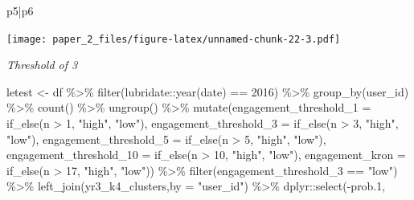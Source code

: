 \documentclass[
]{article}
\newenvironment{Shaded}{\begin{snugshade}}{\end{snugshade}}
\newcommand{\AttributeTok}[1]{\textcolor[rgb]{0.77,0.63,0.00}{#1}}
\newcommand{\DecValTok}[1]{\textcolor[rgb]{0.00,0.00,0.81}{#1}}
\newcommand{\FloatTok}[1]{\textcolor[rgb]{0.00,0.00,0.81}{#1}}
\newcommand{\FunctionTok}[1]{\textcolor[rgb]{0.00,0.00,0.00}{#1}}
\newcommand{\NormalTok}[1]{#1}
\newcommand{\OtherTok}[1]{\textcolor[rgb]{0.56,0.35,0.01}{#1}}
\newcommand{\SpecialCharTok}[1]{\textcolor[rgb]{0.00,0.00,0.00}{#1}}
\newcommand{\StringTok}[1]{\textcolor[rgb]{0.31,0.60,0.02}{#1}}
\begin{document}
\begin{Shaded}
\begin{Highlighting}[]
\NormalTok{p5}\SpecialCharTok{|}\NormalTok{p6}
\end{Highlighting}
\end{Shaded}

\texttt{[image: paper\_2\_files/figure-latex/unnamed-chunk-22-3.pdf]}

\emph{Threshold of 3}

\begin{Shaded}
\begin{Highlighting}[]
\NormalTok{letest }\OtherTok{\textless{}{-}}\NormalTok{  df }\SpecialCharTok{\%\textgreater{}\%}
  \FunctionTok{filter}\NormalTok{(lubridate}\SpecialCharTok{::}\FunctionTok{year}\NormalTok{(date) }\SpecialCharTok{==} \DecValTok{2016}\NormalTok{) }\SpecialCharTok{\%\textgreater{}\%}
  \FunctionTok{group\_by}\NormalTok{(user\_id) }\SpecialCharTok{\%\textgreater{}\%}
  \FunctionTok{count}\NormalTok{() }\SpecialCharTok{\%\textgreater{}\%}
  \FunctionTok{ungroup}\NormalTok{() }\SpecialCharTok{\%\textgreater{}\%} 
  \FunctionTok{mutate}\NormalTok{(}\AttributeTok{engagement\_threshold\_1 =} \FunctionTok{if\_else}\NormalTok{(n }\SpecialCharTok{\textgreater{}} \DecValTok{1}\NormalTok{, }\StringTok{"high"}\NormalTok{, }\StringTok{"low"}\NormalTok{),}
         \AttributeTok{engagement\_threshold\_3 =} \FunctionTok{if\_else}\NormalTok{(n }\SpecialCharTok{\textgreater{}} \DecValTok{3}\NormalTok{, }\StringTok{"high"}\NormalTok{, }\StringTok{"low"}\NormalTok{),}
         \AttributeTok{engagement\_threshold\_5 =} \FunctionTok{if\_else}\NormalTok{(n }\SpecialCharTok{\textgreater{}} \DecValTok{5}\NormalTok{, }\StringTok{"high"}\NormalTok{, }\StringTok{"low"}\NormalTok{),}
         \AttributeTok{engagement\_threshold\_10 =} \FunctionTok{if\_else}\NormalTok{(n }\SpecialCharTok{\textgreater{}} \DecValTok{10}\NormalTok{, }\StringTok{"high"}\NormalTok{, }\StringTok{"low"}\NormalTok{),}
         \AttributeTok{engagement\_kron =} \FunctionTok{if\_else}\NormalTok{(n }\SpecialCharTok{\textgreater{}} \DecValTok{17}\NormalTok{, }\StringTok{"high"}\NormalTok{, }\StringTok{"low"}\NormalTok{)) }\SpecialCharTok{\%\textgreater{}\%} 
  \FunctionTok{filter}\NormalTok{(engagement\_threshold\_3 }\SpecialCharTok{==} \StringTok{"low"}\NormalTok{) }\SpecialCharTok{\%\textgreater{}\%} 
  \FunctionTok{left\_join}\NormalTok{(yr3\_k4\_clusters,}\AttributeTok{by =} \StringTok{"user\_id"}\NormalTok{) }\SpecialCharTok{\%\textgreater{}\%} 
\NormalTok{  dplyr}\SpecialCharTok{::}\FunctionTok{select}\NormalTok{(}\SpecialCharTok{{-}}\NormalTok{prob}\FloatTok{.1}\NormalTok{,}

\end{Highlighting}
\end{Shaded}
\end{document}
